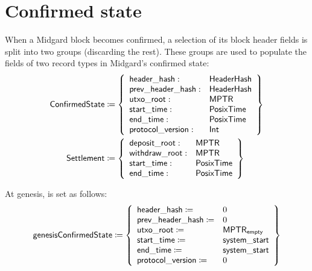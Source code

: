 \documentclass[../midgard.tex]{subfiles}
\begin{document}
\section{Confirmed state}
\label{h:confirmed-state}

When a Midgard block becomes confirmed, a selection of its block header fields is split into two groups (discarding the rest).
These groups are used to populate the fields of two record types in Midgard's confirmed state:
\begingroup
\allowdisplaybreaks
\begin{align*}
    \mathsf{ConfirmedState} &\coloneq \left\{
    \begin{array}{ll}
        \mathsf{header\_hash} : & \mathsf{HeaderHash} \\
        \mathsf{prev\_header\_hash} : & \mathsf{HeaderHash} \\
        \mathsf{utxo\_root} : & \mathsf{MPTR} \\
        \mathsf{start\_time} : & \mathsf{PosixTime} \\
        \mathsf{end\_time} : & \mathsf{PosixTime} \\
        \mathsf{protocol\_version} : & \mathsf{Int} \\
    \end{array} \right\} \\
    \mathsf{Settlement} &\coloneq \left\{
    \begin{array}{ll}
        \mathsf{deposit\_root} : & \mathsf{MPTR} \\
        \mathsf{withdraw\_root} : & \mathsf{MPTR} \\
        \mathsf{start\_time}: & \mathsf{PosixTime} \\
        \mathsf{end\_time}: & \mathsf{PosixTime}
    \end{array} \right\}
\end{align*}
\endgroup

At genesis,  is set as follows:
\begin{equation*}
    \mathsf{genesisConfirmedState} \coloneq \left\{
        \begin{array}{ll}
            \mathsf{header\_hash} \coloneq & 0 \\
            \mathsf{prev\_header\_hash} \coloneq & 0 \\
            \mathsf{utxo\_root} \coloneq & \mathsf{MPTR}_{\mathsf{empty}} \\
            \mathsf{start\_time} \coloneq & \mathsf{system\_start} \\
            \mathsf{end\_time} \coloneq & \mathsf{system\_start} \\
            \mathsf{protocol\_version} \coloneq & 0
        \end{array} \right\}
\end{equation*}
\end{document}
